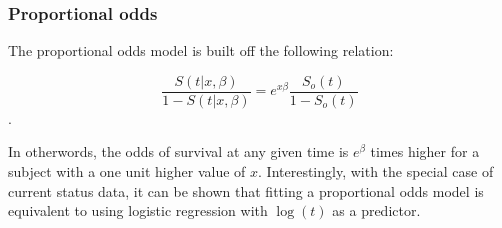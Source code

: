 \documentclass[a4paper]{article}
\begin{document}
    \subsubsection{Proportional odds}
  
  The proportional odds model is built off the following relation:
  
  \[
  \frac{S(t|x, \beta)}{1-S(t | x, \beta)} = e^{x \beta} \frac{S_o(t)}{1 - S_o(t)}
  \].

  In otherwords, the odds of survival at any given time is $e^{\beta}$ times higher for a subject with a one unit higher value of $x$. Interestingly, with the special case of current status data, it can be shown that fitting a proportional odds model is equivalent to using logistic regression with $\log(t)$ as a predictor. 
  
\end{document}
